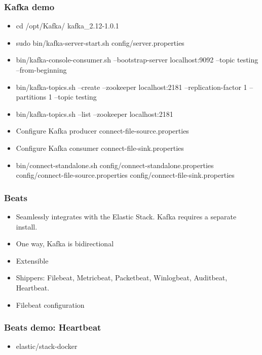 \documentclass[11pt]{beamer}
\begin{document}
\begin{frame}
\frametitle{Kafka demo}
\begin{itemize}
	\item cd /opt/Kafka/ kafka\_2.12-1.0.1
	\item sudo bin/kafka-server-start.sh config/server.properties
	\item bin/kafka-console-consumer.sh --bootstrap-server localhost:9092 --topic testing --from-beginning
	\item bin/kafka-topics.sh --create --zookeeper localhost:2181 --replication-factor 1 --partitions 1 --topic testing
	\item bin/kafka-topics.sh --list --zookeeper localhost:2181
	\item Configure Kafka producer connect-file-source.properties
	\item Configure Kafka consumer connect-file-sink.properties
	\item bin/connect-standalone.sh config/connect-standalone.properties config/connect-file-source.properties config/connect-file-sink.properties
\end{itemize}
\end{frame}

\begin{frame}
\frametitle{Beats}
\begin{itemize}
	\item Seamlessly integrates with the Elastic Stack. Kafka requires a separate install.
	\item One way, Kafka is bidirectional 
	\item Extensible
	\item Shippers: Filebeat, Metricbeat, Packetbeat, Winlogbeat, Auditbeat, Heartbeat.
	\item Filebeat configuration
\end{itemize}
\end{frame}

\begin{frame}
\frametitle{Beats demo: Heartbeat}
\begin{itemize}
	\item elastic/stack-docker
\end{itemize}
\end{frame}
\end{document}
